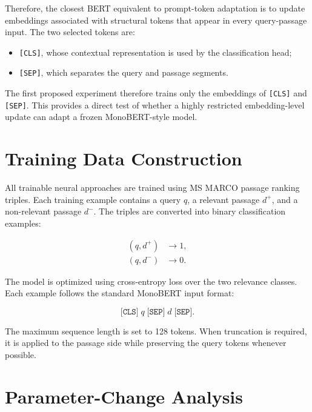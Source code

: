 Therefore, the closest BERT equivalent to prompt-token adaptation is to update embeddings associated with structural tokens that appear in every query-passage input. The two selected tokens are:

\begin{itemize}
    \item \texttt{[CLS]}, whose contextual representation is used by the classification head;
    \item \texttt{[SEP]}, which separates the query and passage segments.
\end{itemize}

The first proposed experiment therefore trains only the embeddings of \texttt{[CLS]} and \texttt{[SEP]}. This provides a direct test of whether a highly restricted embedding-level update can adapt a frozen MonoBERT-style model.

\section{Training Data Construction}
\label{sec:methodology_training_data}

All trainable neural approaches are trained using MS MARCO passage ranking triples. Each training example contains a query $q$, a relevant passage $d^+$, and a non-relevant passage $d^-$. The triples are converted into binary classification examples:

\begin{align}
    (q,d^+) &\rightarrow 1, \\
    (q,d^-) &\rightarrow 0.
\end{align}

The model is optimized using cross-entropy loss over the two relevance classes. Each example follows the standard MonoBERT input format:

\begin{equation}
    \texttt{[CLS]} \; q \; \texttt{[SEP]} \; d \; \texttt{[SEP]}.
\end{equation}

The maximum sequence length is set to 128 tokens. When truncation is required, it is applied to the passage side while preserving the query tokens whenever possible.

\section{Parameter-Change Analysis}
\label{sec:methodology_parameter_change}

